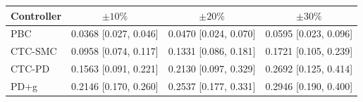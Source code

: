 \begin{tabular}{lccc}
\toprule
Controller & $\pm 10\%$ & $\pm 20\%$ & $\pm 30\%$ \\
\midrule
PBC     & 0.0368 [0.027, 0.046] & 0.0470 [0.024, 0.070] & 0.0595 [0.023, 0.096] \\
CTC-SMC & 0.0958 [0.074, 0.117] & 0.1331 [0.086, 0.181] & 0.1721 [0.105, 0.239] \\
CTC-PD  & 0.1563 [0.091, 0.221] & 0.2130 [0.097, 0.329] & 0.2692 [0.125, 0.414] \\
PD+g    & 0.2146 [0.170, 0.260] & 0.2537 [0.177, 0.331] & 0.2946 [0.190, 0.400] \\
\bottomrule
\end{tabular}
